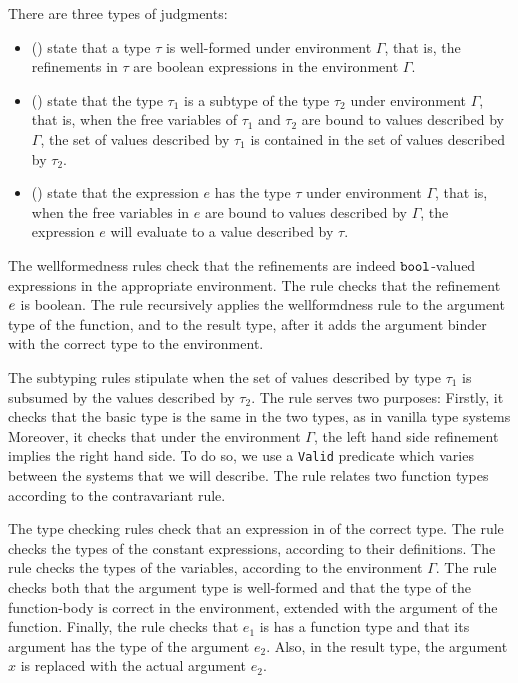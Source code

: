 There are three types of judgments:
\begin{itemize}
\item{ (\isWellFormed{\Gamma}{\tau})} 
state that a type $\tau$ is well-formed under environment
$\Gamma$, that is, the refinements in $\tau$ are boolean 
expressions in the environment $\Gamma$.

\item{ ()} 
state that the type $\tau_1$ is a subtype of the type
$\tau_2$ under environment $\Gamma$, that is, when the free variables
of $\tau_1$ and $\tau_2$
are bound to values described by $\Gamma$, the set of values described
by $\tau_1$ is contained in the set of values described by $\tau_2$. 


\item{ ()} state that
the expression $e$ has the type $\tau$ under environment $\Gamma$,
that is, when the free variables in $e$ are bound to values described by 
$\Gamma$, the expression $e$ will evaluate to a value described by $\tau$.
\end{itemize}

The wellformedness rules check that the 
refinements are indeed $\texttt{bool}$-valued expressions in the 
appropriate environment.
The rule \wtBase checks that the  
refinement $e$ is boolean.
The rule \wtFun recursively applies the wellformdness rule to
the argument type of the function, and to the result type, 
after it adds the argument binder with the correct type to 
the environment.

The subtyping rules stipulate when the set of values described 
by type $\tau_1$ is subsumed by the values described by $\tau_2$.
%
The rule \tsubBase serves two purposes:
Firstly,
it checks that the basic type is the same in the two types, 
as in vanilla type systems
Moreover, it checks that under the environment $\Gamma$, 
the left hand side refinement implies the right hand side.
To do so, we use a \texttt{Valid} predicate which varies between the systems that we will describe.
%
The rule \tsubFun relates two function types according to the contravariant rule.

The type checking rules check that an expression in of the correct type.
The rule \tconst checks the types of the constant expressions, according 
to their definitions.
The rule \tvariable checks the types of the variables, according 
to the environment $\Gamma$.
The rule \tfunction checks both that the argument type is well-formed 
and that the type of the function-body
is correct in the environment, extended with the argument of the function.
Finally, the rule \tapp checks that $e_1$ is has a function type
and that its argument has the type of the argument $e_2$.
Also, in the result type, the argument $x$ is replaced with the actual argument $e_2$.

